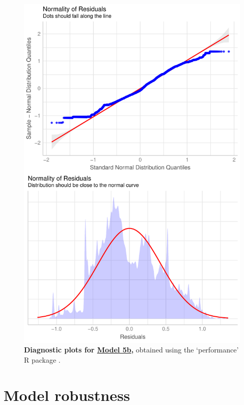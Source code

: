 \begin{figure}[h!]
\centering
\includegraphics[scale=0.6]{Supporting/Chapter3/Figures/Diagnostics/Model5b_diag}
\caption[Diagnostic plots for Model 5b]{\textbf{Diagnostic plots for \underline{Model 5b},} obtained using the `performance' R package \citep{performance}.}
\label{}
\end{figure}

\newpage
\clearpage

\section{Model robustness}


